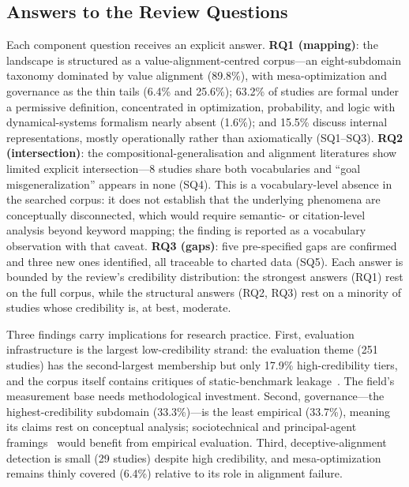 \subsection{Answers to the Review Questions}
Each component question receives an explicit answer. \textbf{RQ1 (mapping)}: the landscape is structured as a value-alignment-centred corpus---an eight-subdomain taxonomy dominated by value alignment (89.8\%), with mesa-optimization and governance as the thin tails (6.4\% and 25.6\%); 63.2\% of studies are formal under a permissive definition, concentrated in optimization, probability, and logic with dynamical-systems formalism nearly absent (1.6\%); and 15.5\% discuss internal representations, mostly operationally rather than axiomatically (SQ1--SQ3). \textbf{RQ2 (intersection)}: the compositional-generalisation and alignment literatures show limited explicit intersection---8 studies share both vocabularies and ``goal misgeneralization'' appears in none (SQ4). This is a vocabulary-level absence in the searched corpus: it does not establish that the underlying phenomena are conceptually disconnected, which would require semantic- or citation-level analysis beyond keyword mapping; the finding is reported as a vocabulary observation with that caveat. \textbf{RQ3 (gaps)}: five pre-specified gaps are confirmed and three new ones identified, all traceable to charted data (SQ5). Each answer is bounded by the review's credibility distribution: the strongest answers (RQ1) rest on the full corpus, while the structural answers (RQ2, RQ3) rest on a minority of studies whose credibility is, at best, moderate.

Three findings carry implications for research practice. First, evaluation infrastructure is the largest low-credibility strand: the evaluation theme (251 studies) has the second-largest membership but only 17.9\% high-credibility tiers, and the corpus itself contains critiques of static-benchmark leakage~\cite{P864}. The field's measurement base needs methodological investment. Second, governance---the highest-credibility subdomain (33.3\%)---is the least empirical (33.7\%), meaning its claims rest on conceptual analysis; sociotechnical and principal-agent framings~\cite{P007,P128} would benefit from empirical evaluation. Third, deceptive-alignment detection is small (29 studies) despite high credibility, and mesa-optimization remains thinly covered (6.4\%) relative to its role in alignment failure.

